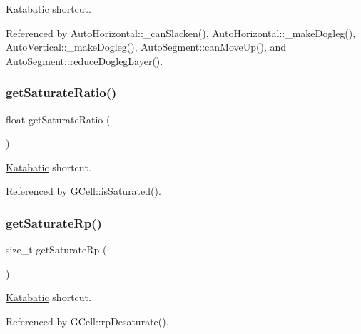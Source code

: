 \hyperlink{namespaceKatabatic}{Katabatic} shortcut. 

Referenced by Auto\+Horizontal\+::\+\_\+can\+Slacken(), Auto\+Horizontal\+::\+\_\+make\+Dogleg(), Auto\+Vertical\+::\+\_\+make\+Dogleg(), Auto\+Segment\+::can\+Move\+Up(), and Auto\+Segment\+::reduce\+Dogleg\+Layer().

\mbox{\label{classKatabatic_1_1Session_a266a4079ca235e8fdb622ef4996d324d}} 
\subsubsection{\texorpdfstring{get\+Saturate\+Ratio()}{getSaturateRatio()}}
{\footnotesize\ttfamily float get\+Saturate\+Ratio (\begin{DoxyParamCaption}{ }\end{DoxyParamCaption})\hspace{0.3cm}{\ttfamily [static]}}

\hyperlink{namespaceKatabatic}{Katabatic} shortcut. 

Referenced by G\+Cell\+::is\+Saturated().

\mbox{\label{classKatabatic_1_1Session_adfdaa8b3e81de14fce1f99444b35fcda}} 
\subsubsection{\texorpdfstring{get\+Saturate\+Rp()}{getSaturateRp()}}
{\footnotesize\ttfamily size\+\_\+t get\+Saturate\+Rp (\begin{DoxyParamCaption}{ }\end{DoxyParamCaption})\hspace{0.3cm}{\ttfamily [static]}}

\hyperlink{namespaceKatabatic}{Katabatic} shortcut. 

Referenced by G\+Cell\+::rp\+Desaturate().

\mbox{\label{classKatabatic_1_1Session_a909ce95ac840ee708f9a49366f0c2690}} 
